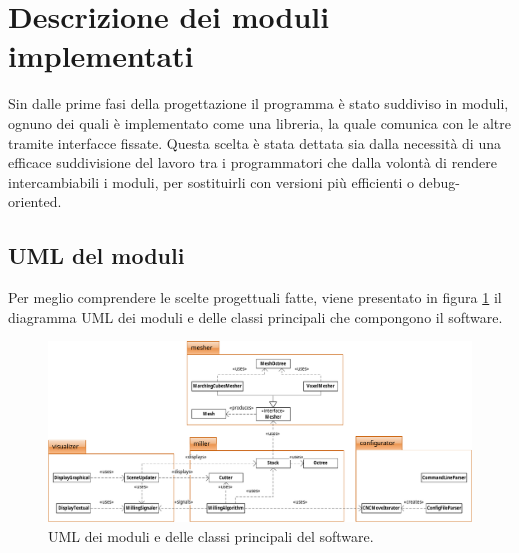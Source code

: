\section{Descrizione dei moduli implementati}
Sin dalle prime fasi della progettazione il programma è stato suddiviso in moduli, ognuno dei quali è implementato come una libreria, la quale comunica con le altre tramite interfacce fissate. Questa scelta è stata dettata sia dalla necessità di una efficace suddivisione del lavoro tra i programmatori che dalla volontà di rendere intercambiabili i moduli, per sostituirli con versioni più efficienti o debug-oriented.


\subsection{UML del moduli}
Per meglio comprendere le scelte progettuali fatte, viene presentato in figura \ref{fig:uml_cncsimulator} il diagramma UML dei moduli e delle classi principali che compongono il software.
\begin{figure}[htp]
	\centering
	\includegraphics[width=.97\textheight, angle=90]{img/uml_cncsimulator}
	\caption{UML dei moduli e delle classi principali del software.}
	\label{fig:uml_cncsimulator}
\end{figure}








